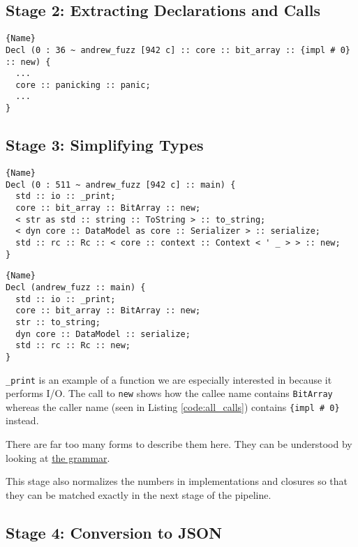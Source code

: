 \documentclass[11pt]{article}
\begin{document}
\subsection{Stage 2: Extracting Declarations and Calls}

\begin{lstlisting}[caption=Extracted Calls, label=code:all_calls]{Name}
Decl (0 : 36 ~ andrew_fuzz [942 c] :: core :: bit_array :: {impl # 0} :: new) {
  ...
  core :: panicking :: panic;
  ...
}
\end{lstlisting}

\subsection{Stage 3: Simplifying Types}

\begin{lstlisting}[caption=Before Simplifying Types, label=before_simplify_types]{Name}
Decl (0 : 511 ~ andrew_fuzz [942 c] :: main) {
  std :: io :: _print;
  core :: bit_array :: BitArray :: new;
  < str as std :: string :: ToString > :: to_string;
  < dyn core :: DataModel as core :: Serializer > :: serialize;
  std :: rc :: Rc :: < core :: context :: Context < ' _ > > :: new;
}
\end{lstlisting}
\begin{lstlisting}[caption=After Simplifying Types, label=after_simplifying_types]{Name}
Decl (andrew_fuzz :: main) {
  std :: io :: _print;
  core :: bit_array :: BitArray :: new;
  str :: to_string;
  dyn core :: DataModel :: serialize;
  std :: rc :: Rc :: new;
}
\end{lstlisting}

\lstinline{_print} is an example of a function we are especially interested in because it performs I/O.
The call to \lstinline{new} shows how the callee name contains \lstinline{BitArray} whereas the caller name (seen in Listing \ref{code:all_calls}) contains \lstinline|{impl # 0}| instead.

There are far too many forms to describe them here.
They can be understood by looking at \href{https://github.com/Andrew-Fryer/external_function_annotation/blob/master/simplify_types.txl#L49}{the grammar}.

This stage also normalizes the numbers in implementations and closures so that they can be matched exactly in the next stage of the pipeline.

\subsection{Stage 4: Conversion to JSON}
\end{document}
